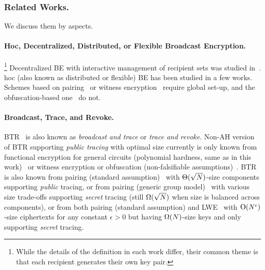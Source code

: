 \subsubsection{Related Works.}
We discuss them by aspects.

\paragraph{\Ad Hoc, Decentralized, Distributed, or Flexible
Broadcast Encryption.}
\leavevmode\unskip\footnote{
While the details of the definition in each work differ,
their common theme is that each recipient generates their own key pair.}
Decentralized BE
with interactive management of recipient sets
was studied in~\cite{SCN:PhaPoiStr12,PAIRING:DelPaiPoi07}.
\Ad hoc (also known as distributed or flexible) BE
has been studied in a few works.
Schemes based on
pairing~\cite{DHMR08,CCS:WQZD10,KolMalWee23} or
witness encryption~\cite{C:FreWatWu23}
require global set-up, and
the obfuscation-based one~\cite{C:BonZha14} do not.

\paragraph{Broadcast, Trace, and Revoke.}
BTR~\cite{FC:NaoPin00,C:NaoNaoLot01} is also known as
\emph{broadcast and trace} or \emph{trace and revoke}.
Non-AH version of BTR supporting \emph{public tracing} with optimal size
currently is only known from
functional encryption for general circuits
(polynomial hardness, same as in this work)~\cite{EC:AKYY23,EC:JaiLinLuo23}
or witness encryption or obfuscation
(non-falsifiable assumptions)~\cite{EC:NisWicZha16,PKC:GoyVusWat19}.
BTR is also known
from pairing (standard assumption)~\cite{CCS:BonWat06,CCS:GKSW10}
with $\operatorname{\Theta}(\sqrt{N})$-size components supporting \emph{public} tracing,
or from pairing (generic group model)~\cite{C:Zhandry20}
with various size trade-offs supporting \emph{secret} tracing
(still $\operatorname{\Omega}(\sqrt{N})$ when size is balanced across components),
or from both pairing (standard assumption) and LWE~\cite{C:GQWW19}
with $\bigO(N^\epsilon)$-size ciphertexts for any constant ${\epsilon>0}$
but having $\operatorname{\Omega}(N)$-size keys and only supporting \emph{secret} tracing.

